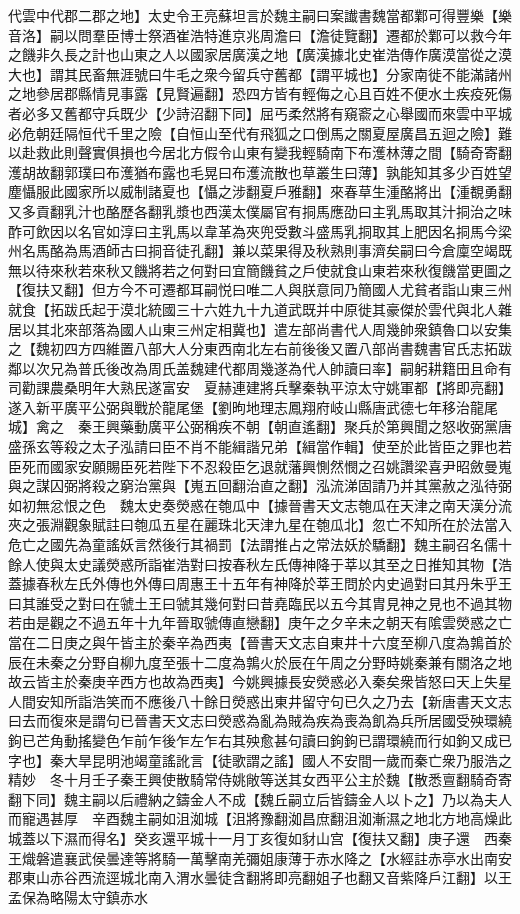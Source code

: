 代雲中代郡二郡之地】太史令王亮蘇坦言於魏主嗣曰案䜟書魏當都鄴可得豐樂【樂音洛】嗣以問羣臣博士祭酒崔浩特進京兆周澹曰【澹徒覽翻】遷都於鄴可以救今年之饑非久長之計也山東之人以國家居廣漢之地【廣漢據北史崔浩傳作廣漠當從之漠大也】謂其民畜無涯號曰牛毛之衆今留兵守舊都【謂平城也】分家南徙不能滿諸州之地參居郡縣情見事露【見賢遍翻】恐四方皆有輕侮之心且百姓不便水土疾疫死傷者必多又舊都守兵既少【少詩沼翻下同】屈丐柔然將有窺窬之心舉國而來雲中平城必危朝廷隔恒代千里之險【自恒山至代有飛狐之口倒馬之關夏屋廣昌五迴之險】難以赴救此則聲實俱損也今居北方假令山東有變我輕騎南下布濩林薄之間【騎奇寄翻濩胡故翻郭璞曰布濩猶布露也毛晃曰布濩流散也草叢生曰薄】孰能知其多少百姓望塵懾服此國家所以威制諸夏也【懾之涉翻夏戶雅翻】來春草生湩酪將出【湩覩勇翻又多貢翻乳汁也酪歷各翻乳漿也西漢太僕屬官有挏馬應劭曰主乳馬取其汁挏治之味酢可飲因以名官如淳曰主乳馬以韋革為夾兜受數斗盛馬乳挏取其上肥因名挏馬今梁州名馬酪為馬酒師古曰挏音徒孔翻】兼以菜果得及秋熟則事濟矣嗣曰今倉廩空竭既無以待來秋若來秋又饑將若之何對曰宜簡饑貧之戶使就食山東若來秋復饑當更圖之【復扶又翻】但方今不可遷都耳嗣悦曰唯二人與朕意同乃簡國人尤貧者詣山東三州就食【拓跋氏起于漠北統國三十六姓九十九道武既并中原徙其豪傑於雲代與北人雜居以其北來部落為國人山東三州定相冀也】遣左部尚書代人周幾帥衆鎮魯口以安集之【魏初四方四維置八部大人分東西南北左右前後後又置八部尚書魏書官氏志拓跋鄰以次兄為普氏後改為周氏盖魏建代都周幾遂為代人帥讀曰率】嗣躬耕籍田且命有司勸課農桑明年大熟民遂富安　夏赫連建將兵擊秦執平涼太守姚軍都【將即亮翻】遂入新平廣平公弼與戰於龍尾堡【劉昫地理志鳳翔府岐山縣唐武德七年移治龍尾城】禽之　秦王興藥動廣平公弼稱疾不朝【朝直遙翻】聚兵於第興聞之怒收弼黨唐盛孫玄等殺之太子泓請曰臣不肖不能緝諧兄弟【緝當作輯】使至於此皆臣之罪也若臣死而國家安願賜臣死若陛下不忍殺臣乞退就藩興惻然憫之召姚讚梁喜尹昭斂曼嵬與之謀囚弼將殺之窮治黨與【嵬五回翻治直之翻】泓流涕固請乃并其黨赦之泓待弼如初無忿恨之色　魏太史奏熒惑在匏瓜中【據晉書天文志匏瓜在天津之南天漢分流夾之張淵觀象賦註曰匏瓜五星在麗珠北天津九星在匏瓜北】忽亡不知所在於法當入危亡之國先為童謠妖言然後行其禍罰【法謂推占之常法妖於驕翻】魏主嗣召名儒十餘人使與太史議熒惑所詣崔浩對曰按春秋左氏傳神降于莘以其至之日推知其物【浩蓋據春秋左氏外傳也外傳曰周惠王十五年有神降於莘王問於内史過對曰其丹朱乎王曰其誰受之對曰在虢土王曰虢其幾何對曰昔堯臨民以五今其胄見神之見也不過其物若由是觀之不過五年十九年晉取虢傳直戀翻】庚午之夕辛未之朝天有隂雲熒惑之亡當在二日庚之與午皆主於秦辛為西夷【晉書天文志自東井十六度至柳八度為鶉首於辰在未秦之分野自柳九度至張十二度為鶉火於辰在午周之分野時姚秦兼有關洛之地故云皆主於秦庚辛西方也故為西夷】今姚興據長安熒惑必入秦矣衆皆怒曰天上失星人間安知所詣浩笑而不應後八十餘日熒惑出東井留守句已久之乃去【新唐書天文志曰去而復來是謂句已晉書天文志曰熒惑為亂為賊為疾為喪為飢為兵所居國受殃環繞鉤已芒角動搖變色乍前乍後乍左乍右其殃愈甚句讀曰鉤鉤已謂環繞而行如鉤又成已字也】秦大旱昆明池竭童謠訛言【徒歌謂之謠】國人不安間一歲而秦亡衆乃服浩之精妙　冬十月壬子秦王興使散騎常侍姚敞等送其女西平公主於魏【散悉亶翻騎奇寄翻下同】魏主嗣以后禮納之鑄金人不成【魏丘嗣立后皆鑄金人以卜之】乃以為夫人而寵遇甚厚　辛酉魏主嗣如沮洳城【沮將豫翻洳昌庶翻沮洳漸濕之地北方地高燥此城蓋以下濕而得名】癸亥還平城十一月丁亥復如豺山宫【復扶又翻】庚子還　西秦王熾磐遣襄武侯曇達等將騎一萬擊南羌彌姐康薄于赤水降之【水經註赤亭水出南安郡東山赤谷西流逕城北南入渭水曇徒含翻將即亮翻姐子也翻又音紫降戶江翻】以王孟保為略陽太守鎮赤水　